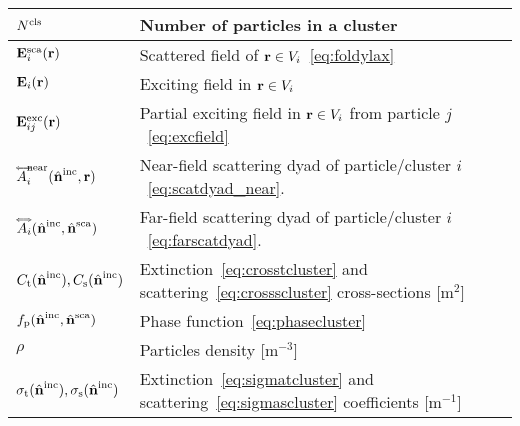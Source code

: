 \begin{table}[!ht]
\begin{tabular}{ll}
        $N^\mathrm{cls}$ & Number of particles in a cluster \\
        \hline
        $\mathbf{E}^\mathrm{sca}_i(\mathbf{r})$ & Scattered field of $\mathbf{r}\in V_i$~\eqref{eq:foldylax}\\
        $\mathbf{E}_i(\mathbf{r})$ & Exciting field in $\mathbf{r}\in V_i$ \\
        $\mathbf{E}^\mathrm{exc}_{ij}(\mathbf{r})$ & Partial exciting field in $\mathbf{r}\in V_i$ from particle $j$~\eqref{eq:excfield} \\
        ${\accentset{\Longleftrightarrow}{A}}_i^\text{near}({\hat{\mathbf{n}}}^\mathrm{inc},\mathbf{r})$ & Near-field scattering dyad of particle/cluster $i$~\eqref{eq:scatdyad_near}. \\
        ${\accentset{\Longleftrightarrow}{A}}_i({\hat{\mathbf{n}}}^\mathrm{inc},{\hat{\mathbf{n}}}^\mathrm{sca})$ & Far-field scattering dyad of particle/cluster $i$~\eqref{eq:farscatdyad}. \\
        \hline
        \hline
        $C_\mathrm{t}({\hat{\mathbf{n}}}^\mathrm{inc}),C_\mathrm{s}({\hat{\mathbf{n}}}^\mathrm{inc})$ & Extinction~\eqref{eq:crosstcluster} and scattering~\eqref{eq:crossscluster} cross-sections [m$^{2}$]\\
        $f_\mathrm{p}({\hat{\mathbf{n}}}^\mathrm{inc},{\hat{\mathbf{n}}}^\mathrm{sca})$ & Phase function~\eqref{eq:phasecluster}\\
        $\rho$ & Particles density [m$^{-3}$] \\
        $\sigma_\mathrm{t}({\hat{\mathbf{n}}}^\mathrm{inc}),\sigma_\mathrm{s}({\hat{\mathbf{n}}}^\mathrm{inc})$ & Extinction~\eqref{eq:sigmatcluster} and scattering~\eqref{eq:sigmascluster} coefficients [m$^{-1}$]
    \end{tabular}
\end{table}